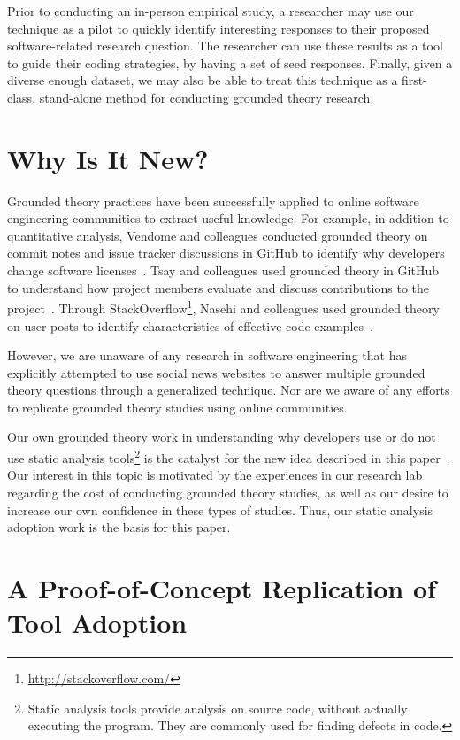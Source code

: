 \documentclass{sig-alternate}
\begin{document}
Prior to conducting an in-person empirical study, a researcher may use our technique as a pilot to quickly identify interesting responses to their proposed software-related research question. The researcher can use these results as a tool to guide their coding strategies, by having a set of seed responses. Finally, given a diverse enough dataset, we may also be able to treat this technique as a first-class, stand-alone method for conducting grounded theory research.


\section{Why Is It New?}

Grounded theory practices have been successfully applied to online software engineering communities to extract useful knowledge.
For example, in addition to quantitative analysis, Vendome and colleagues conducted grounded theory on commit notes and issue tracker discussions in GitHub to identify why developers change software licenses~\cite{Vendome2015}. Tsay and colleagues used grounded theory in GitHub to understand how project members evaluate and discuss contributions to the project~\cite{Tsay2014}. Through StackOverflow\footnote{\url{http://stackoverflow.com/}}, Nasehi and colleagues used grounded theory on user posts to identify characteristics of effective code examples~\cite{Nasehi2012}.

However, we are unaware of any research in software engineering that has explicitly attempted to use social news websites to answer multiple grounded theory questions through a generalized technique. Nor are we aware of any efforts to replicate grounded theory studies using online communities.

Our own grounded theory work in understanding why developers use or do not use static analysis tools\footnote{Static analysis tools provide analysis on source code, without actually executing the program. They are commonly used for finding defects in code.} is the catalyst for the new idea described in this paper~\cite{Johnson2013a}. Our interest in this topic is motivated by the experiences in our research lab regarding the cost of conducting grounded theory studies, as well as our desire to increase our own confidence in these types of studies. Thus, our static analysis adoption work is the basis for this paper.

\section{A Proof-of-Concept Replication of Tool Adoption}
\end{document}

